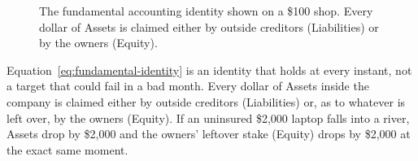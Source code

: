 \begin{figure}[htbp]
\centering
{}
\caption{The fundamental accounting identity shown on a \$100 shop. Every dollar of Assets is claimed either by outside creditors (Liabilities) or by the owners (Equity).}
\label{fig:ch01-fundamental-identity}
\end{figure}


\begin{formalbox}
Equation~\eqref{eq:fundamental-identity} is an identity that holds at every instant, not a target that could fail in a bad month. Every dollar of Assets inside the company is claimed either by outside creditors (Liabilities) or, as to whatever is left over, by the owners (Equity). If an uninsured \$2,000 laptop falls into a river, Assets drop by \$2,000 and the owners' leftover stake (Equity) drops by \$2,000 at the exact same moment.
\end{formalbox}


